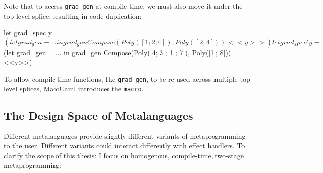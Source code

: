 Note that to access \texttt{grad_gen} at compile-time, we must also move it under the top-level splice, resulting in code duplication:

\begin{macocaml}
let grad_spec y  = $(let grad_gen = ... in 
                     grad_gen Compose(Poly([1 ; 2 ; 0]), Poly([2 ; 4])) <<y>>) 
let grad_spec' y = $(let grad_gen = ... in 
                     grad_gen Compose(Poly([4; 3 ; 1 ; 7]), Poly([1 ; 8])) <<y>>) 
\end{macocaml}

To allow compile-time functions, like \texttt{grad_gen}, to be re-used across multiple top-level splices, MacoCaml introduces the \texttt{macro}.


\subsection{The Design Space of Metalanguages}\label{subsection:metaprogramming-design}
Different metalanguages provide slightly different variants of metaprogramming to the user. Different variants could interact differently with effect handlers. To clarify the scope of this thesis: I focus on homogenous, compile-time, two-stage metaprogramming: 


